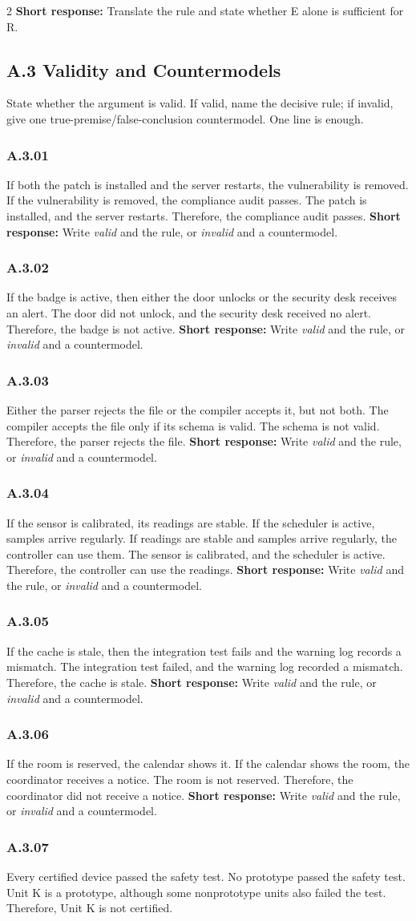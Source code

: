 \documentclass[10pt]{extarticle}
\newcommand{\bankitem}[1]{\subsubsection*{#1}}
\begin{document}
\begin{multicols}{2}
\textbf{Short response:} Translate the rule and state whether E alone is sufficient for R.
\subsection*{A.3 Validity and Countermodels}
State whether the argument is valid. If valid, name the decisive rule; if invalid,
give one true-premise/false-conclusion countermodel. One line is enough.
\bankitem{A.3.01}
If both the patch is installed and the server restarts, the vulnerability is removed. If the vulnerability is removed, the compliance audit passes. The patch is installed, and the server restarts. Therefore, the compliance audit passes.
\textbf{Short response:} Write \emph{valid} and the rule, or \emph{invalid} and a countermodel.
\bankitem{A.3.02}
If the badge is active, then either the door unlocks or the security desk receives an alert. The door did not unlock, and the security desk received no alert. Therefore, the badge is not active.
\textbf{Short response:} Write \emph{valid} and the rule, or \emph{invalid} and a countermodel.
\bankitem{A.3.03}
Either the parser rejects the file or the compiler accepts it, but not both. The compiler accepts the file only if its schema is valid. The schema is not valid. Therefore, the parser rejects the file.
\textbf{Short response:} Write \emph{valid} and the rule, or \emph{invalid} and a countermodel.
\bankitem{A.3.04}
If the sensor is calibrated, its readings are stable. If the scheduler is active, samples arrive regularly. If readings are stable and samples arrive regularly, the controller can use them. The sensor is calibrated, and the scheduler is active. Therefore, the controller can use the readings.
\textbf{Short response:} Write \emph{valid} and the rule, or \emph{invalid} and a countermodel.
\bankitem{A.3.05}
If the cache is stale, then the integration test fails and the warning log records a mismatch. The integration test failed, and the warning log recorded a mismatch. Therefore, the cache is stale.
\textbf{Short response:} Write \emph{valid} and the rule, or \emph{invalid} and a countermodel.
\bankitem{A.3.06}
If the room is reserved, the calendar shows it. If the calendar shows the room, the coordinator receives a notice. The room is not reserved. Therefore, the coordinator did not receive a notice.
\textbf{Short response:} Write \emph{valid} and the rule, or \emph{invalid} and a countermodel.
\bankitem{A.3.07}
Every certified device passed the safety test. No prototype passed the safety test. Unit K is a prototype, although some nonprototype units also failed the test. Therefore, Unit K is not certified.

\end{multicols}
\end{document}
